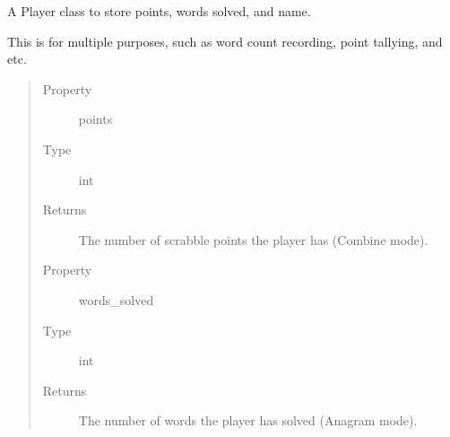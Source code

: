 \documentclass[letterpaper,10pt,english,openany,oneside]{sphinxmanual}
\begin{document}
\begin{fulllineitems}
\label{\detokenize{index:player.Player}}
A Player class to store points, words solved, and name.

This is for multiple purposes, such as word count recording,
point tallying, and etc.
\begin{quote}\begin{description}
\item[{Property}] \leavevmode
points

\item[{Type}] \leavevmode
int

\item[{Returns}] \leavevmode
The number of scrabble points the player has (Combine mode).

\item[{Property}] \leavevmode
words\_solved

\item[{Type}] \leavevmode
int

\item[{Returns}] \leavevmode
The number of words the player has solved (Anagram mode).

\end{description}\end{quote}

\end{fulllineitems}



\renewcommand{\indexname}{Python Module Index}
\begin{sphinxtheindex}
\let\bigletter\sphinxstyleindexlettergroup
\bigletter{a}
\item\relax{}
\indexspace
\bigletter{c}
\item\relax{}
\item\relax{}
\indexspace
\bigletter{e}
\item\relax{}
\indexspace
\bigletter{i}
\item\relax{}
\indexspace
\bigletter{m}
\item\relax{}
\indexspace
\bigletter{p}
\item\relax{}
\end{sphinxtheindex}

\renewcommand{\indexname}{Index}
\printindex
\end{document}
